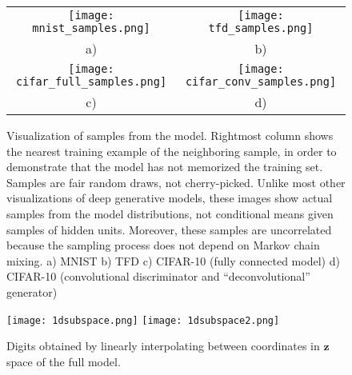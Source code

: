 \documentclass{article}
\begin{document}
\begin{figure}[h]
\centering
\begin{tabular}{cc}
 \texttt{[image: mnist\_samples.png]} &
 \texttt{[image: tfd\_samples.png]} \\
a) & b) \\
 \texttt{[image: cifar\_full\_samples.png]} &
 \texttt{[image: cifar\_conv\_samples.png]} \\
 c) & d)
\end{tabular}
\caption{
\small Visualization of samples from the model. Rightmost column shows the
nearest training example of the neighboring sample, in order to demonstrate
that the model has not memorized the training set. Samples are fair random
draws, not cherry-picked. Unlike most other visualizations of deep generative
models, these images show actual samples from the model distributions, not
conditional means given samples of hidden units. Moreover, these samples are
uncorrelated because the sampling process does not depend on Markov chain mixing.
a) MNIST b) TFD c) CIFAR-10 (fully connected model)
d) CIFAR-10 (convolutional discriminator and ``deconvolutional'' generator)
}
\label{fig:visuals1}
\end{figure}

\iffalse
\begin{figure}[h]
\centering
    \texttt{[image: 2dmanifold.png]} 
    \caption{\small The manifold of MNIST digits learned by a small model
      with $\bm{z} \in \mathbf{R}^2$. }
\label{fig:visuals2}
\end{figure}
\fi

\begin{figure}[h]
\centering
    \texttt{[image: 1dsubspace.png]} 
    \texttt{[image: 1dsubspace2.png]} 
    \caption{\small Digits obtained by linearly interpolating between
      coordinates in $\bm{z}$ space of the full model.}
\label{fig:visuals3}
\end{figure}

\iffalse
\begin{figure}[h]
\centering
\begin{minipage}{.5\textwidth}
    \centering
    \texttt{[image: failure.pdf]} 
    \caption{\small Failure case of discriminator}
    \label{fig:failure}
\end{minipage}\begin{minipage}{.5\textwidth}
    \centering
    \texttt{[image: helvetica.png]} 
    \caption{\small TODO Training only G for a fixed D}
    \label{fig:helvetica}
\end{minipage}
\end{figure}
\fi
\end{document}
